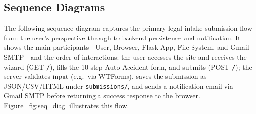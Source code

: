 \documentclass{article}
\begin{document}
\subsection{Sequence Diagrams}\label{ss:seqdiag}
The following sequence diagram captures the primary legal intake submission flow 
from the user's perspective through to backend persistence and notification. 
It shows the main participants---User, Browser, Flask App, File System, and Gmail SMTP---and 
the order of interactions: the user accesses the site and receives the wizard (GET \texttt{/}), 
fills the 10-step Auto Accident form, and submits (POST \texttt{/}); 
the server validates input (e.g.\ via WTForms), 
saves the submission as JSON/CSV/HTML under \texttt{submissions/}, and 
sends a notification email via Gmail SMTP before returning a success response to the browser. 
Figure~\ref{fig:seq_diag} illustrates this flow.
\end{document}
